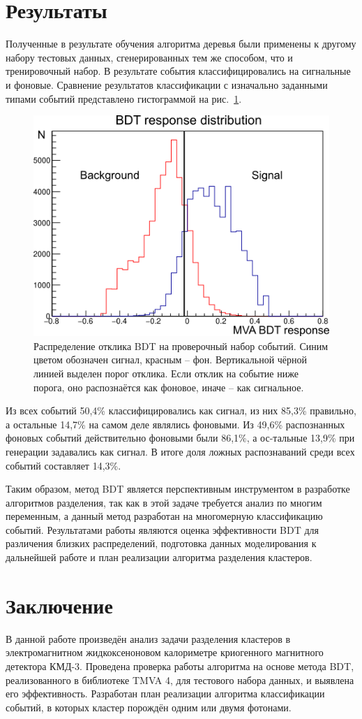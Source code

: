 \documentclass[14pt]{extarticle}
\begin{document}
\section{Результаты}
Полученные в результате обучения алгоритма деревья были применены к другому набору тестовых данных, сгенерированных тем же способом, что и тренировочный набор. В результате события классифицировались на сигнальные и фоновые. Сравнение результатов классификации с изначально заданными типами событий представлено гистограммой на рис.~\ref{fig:verification}.

\begin{figure}[h!]
	\centering
	\includegraphics[width=0.7\linewidth]{../pics/verification2.png}
	\caption{Распределение отклика BDT на проверочный набор событий. Синим цветом обозначен сигнал, красным -- фон. Вертикальной чёрной линией выделен порог отклика. Если отклик на событие ниже порога, оно распознаётся как фоновое, иначе -- как сигнальное.}
	\label{fig:verification}
\end{figure}

Из всех событий 50,4\% классифицировались как сигнал, из них 85,3\% правильно, а остальные 14,7\% на самом деле являлись фоновыми. Из 49,6\% распознанных фоновых событий действительно фоновыми были 86,1\%, а ос-тальные 13,9\% при генерации задавались как сигнал. В итоге доля ложных распознаваний среди всех событий составляет 14,3\%.

Таким образом, метод BDT является перспективным инструментом в разработке алгоритмов разделения, так как в этой задаче требуется анализ по многим переменным, а данный метод разработан на многомерную классификацию событий. Результатами работы являются оценка эффективности BDT для различения близких распределений, подготовка данных моделирования к дальнейшей работе и план реализации алгоритма разделения кластеров.
\section{Заключение}
В данной работе произведён анализ задачи разделения кластеров в электромагнитном жидкоксеноновом калориметре криогенного магнитного детектора КМД-3. Проведена проверка работы алгоритма на основе метода BDT, реализованного в библиотеке TMVA 4, для тестового набора данных, и выявлена его эффективность. Разработан план реализации алгоритма классификации событий, в которых кластер порождён одним или двумя фотонами.
\end{document}
